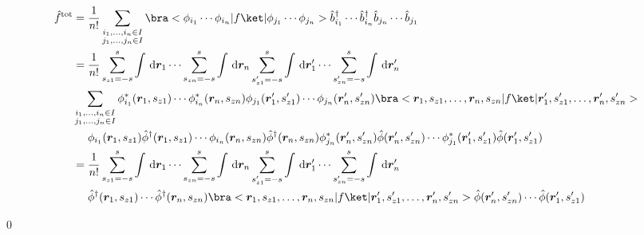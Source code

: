 \documentclass[uplatex,dvipdfmx,a4paper,11pt]{jlreq}
\makeatletter
\newcommand{\rr}{\bm{r}}
\numberwithin{equation}{section}
\theoremstyle{definition}
\renewenvironment{proof}[1][\proofname]{\par
  \normalfont
  \topsep6\p@\@plus6\p@ \trivlist
  \item[\hskip\labelsep{\bfseries #1}\@addpunct{\bfseries}]\ignorespaces\quad\par
}{
  \qed\endtrivlist\@endpefalse
}
\renewcommand\proofname{証明}
\makeatother
\begin{document}
\begin{proof}
  \begin{align}
    \hat{f}^{\mathrm{tot}} & = \frac{1}{n!}\sum_{\substack{i_1,\ldots,i_n\in I                                                                                                                                                                            \\ j_1,\ldots,j_n\in I}}\bra<\phi_{i_1}\cdots\phi_{i_n}|f\ket|\phi_{j_1}\cdots\phi_{j_n}>\hat{b}_{i_1}^\dagger\cdots\hat{b}_{i_n}^\dagger\hat{b}_{j_n}\cdots\hat{b}_{j_1} \\
                           & = \frac{1}{n!}\sum_{s_{z1} = -s}^s\int\dl{\rr_1}\cdots\sum_{s_{zn} = -s}^s\int\dl{\rr_n}\sum_{s_{z1}' = -s}^s\int\dl{\rr_1'}\cdots\sum_{s_{zn}' = -s}^s\int\dl{\rr_n'}                                                       \\
                           & \sum_{\substack{i_1,\ldots,i_n\in I                                                                                                                                                                                          \\ j_1,\ldots,j_n\in I}}
    \phi_{i_1}^*(\rr_1,s_{z1})\cdots\phi_{i_n}^*(\rr_n,s_{zn})\phi_{j_1}(\rr_1',s_{z1}')\cdots\phi_{j_n}(\rr_n',s_{zn}')
    \bra<\rr_1,s_{z1},\ldots,\rr_n,s_{zn}|f\ket|\rr_1',s_{z1}',\ldots,\rr_n',s_{zn}'>                                                                                                                                                                     \\
                           & \quad\ \phi_{i_1}(\rr_1, s_{z1})\hat{\phi}^\dagger(\rr_1, s_{z1})\cdots\phi_{i_n}(\rr_n, s_{zn})\hat{\phi}^\dagger(\rr_n, s_{zn})
    \phi_{j_n}^*(\rr_n', s_{zn}')\hat{\phi}(\rr_n', s_{zn}')\cdots\phi_{j_1}^*(\rr_1', s_{z1}')\hat{\phi}(\rr_1', s_{z1}')                                                                                                                                \\
                           & = \frac{1}{n!}\sum_{s_{z1} = -s}^s\int\dl{\rr_1}\cdots\sum_{s_{zn} = -s}^s\int\dl{\rr_n}\sum_{s_{z1}' = -s}^s\int\dl{\rr_1'}\cdots\sum_{s_{zn}' = -s}^s\int\dl{\rr_n'}                                                       \\
                           & \quad\ \hat{\phi}^\dagger(\rr_1, s_{z1})\cdots\hat{\phi}^\dagger(\rr_n, s_{zn})\bra<\rr_1,s_{z1},\ldots,\rr_n,s_{zn}|f\ket|\rr_1',s_{z1}',\ldots,\rr_n',s_{zn}'>\hat{\phi}(\rr_n', s_{zn}')\cdots\hat{\phi}(\rr_1', s_{z1}')
  \end{align}
\end{proof}
\end{document}
